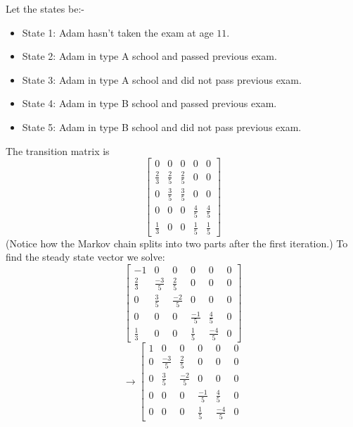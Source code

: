 \documentclass{article}
\begin{document}
\begin{Answer}
  Let the states be:-
  \begin{itemize}
    \item State 1: Adam hasn't taken the exam at age $11$.
    \item State 2: Adam in type A school and passed previous exam.
    \item State 3: Adam in type A school and did not pass previous exam.
    \item State 4: Adam in type B school and passed previous exam.
    \item State 5: Adam in type B school and did not pass previous exam.
  \end{itemize}
  The transition matrix is 
  \begin{equation*}
  \left[
  \begin{array}{ccccc}
  0&0&0&0&0\\
  \frac{2}{3} & \frac{2}{5} & \frac{2}{5} & 0&0\\
  0 & \frac{3}{5} & \frac{3}{5} & 0 & 0\\
  0&0&0 &\frac{4}{5} & \frac{4}{5}\\
  \frac{1}{3} & 0 & 0 & \frac{1}{5} & \frac{1}{5}
  \end{array}
  \right]
  \end{equation*}
  (Notice how the Markov chain splits into two parts after the first iteration.)
  To find the steady state vector we solve:
  \begin{equation*}
  \left[
  \begin{array}{ccccc|c}
  -1&0&0&0&0&0\\
  \frac{2}{3} & \frac{-3}{5} & \frac{2}{5} & 0&0&0\\
  0 & \frac{3}{5} & \frac{-2}{5} & 0 & 0&0\\
  0&0&0 &\frac{-1}{5} & \frac{4}{5}&0\\
  \frac{1}{3} & 0 & 0 & \frac{1}{5} & \frac{-4}{5}&0
  \end{array}
  \right]
  \end{equation*}
  \begin{equation*}
  \rightarrow\left[
  \begin{array}{ccccc|c}
  1&0&0&0&0&0\\
  0 & \frac{-3}{5} & \frac{2}{5} & 0&0&0\\
  0 & \frac{3}{5} & \frac{-2}{5} & 0 & 0&0\\
  0&0&0 &\frac{-1}{5} & \frac{4}{5}&0\\
  0 & 0 & 0 & \frac{1}{5} & \frac{-4}{5}&0

\end{array}
\end{equation*}
\end{Answer}
\end{document}
